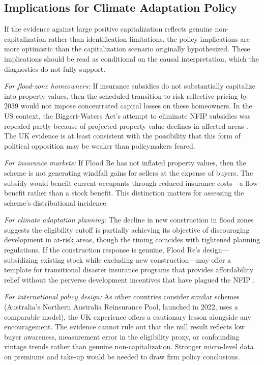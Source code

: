\documentclass[12pt]{article}
\begin{document}
\subsection{Implications for Climate Adaptation Policy}

If the evidence against large positive capitalization reflects genuine non-capitalization rather than identification limitations, the policy implications are more optimistic than the capitalization scenario originally hypothesized. These implications should be read as conditional on the causal interpretation, which the diagnostics do not fully support.

\textit{For flood-zone homeowners:} If insurance subsidies do not substantially capitalize into property values, then the scheduled transition to risk-reflective pricing by 2039 would not impose concentrated capital losses on these homeowners. In the US context, the Biggert-Waters Act's attempt to eliminate NFIP subsidies was repealed partly because of projected property value declines in affected areas \citep{bin2008changes}. The UK evidence is at least consistent with the possibility that this form of political opposition may be weaker than policymakers feared.

\textit{For insurance markets:} If Flood Re has not inflated property values, then the scheme is not generating windfall gains for sellers at the expense of buyers. The subsidy would benefit current occupants through reduced insurance costs---a flow benefit rather than a stock benefit. This distinction matters for assessing the scheme's distributional incidence.

\textit{For climate adaptation planning:} The decline in new construction in flood zones suggests the eligibility cutoff is partially achieving its objective of discouraging development in at-risk areas, though the timing coincides with tightened planning regulations. If the construction response is genuine, Flood Re's design---subsidizing existing stock while excluding new construction---may offer a template for transitional disaster insurance programs that provides affordability relief without the perverse development incentives that have plagued the NFIP \citep{kousky2017examining, browne2000effect}.

\textit{For international policy design:} As other countries consider similar schemes (Australia's Northern Australia Reinsurance Pool, launched in 2022, uses a comparable model), the UK experience offers a cautionary lesson alongside any encouragement. The evidence cannot rule out that the null result reflects low buyer awareness, measurement error in the eligibility proxy, or confounding vintage trends rather than genuine non-capitalization. Stronger micro-level data on premiums and take-up would be needed to draw firm policy conclusions.
\end{document}
